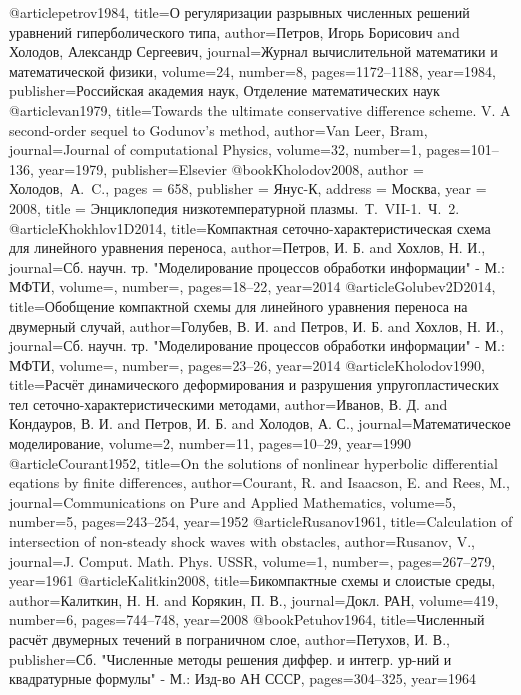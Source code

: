 \documentclass[11pt]{article}
\begin{document}
\begin{thebibliography}{99}
@article{petrov1984,
  title={О регуляризации разрывных численных решений уравнений гиперболического типа},
  author={Петров, Игорь Борисович and Холодов, Александр Сергеевич},
  journal={Журнал вычислительной математики и математической физики},
  volume={24},
  number={8},
  pages={1172--1188},
  year={1984},
  publisher={Российская академия наук, Отделение математических наук}
}
@article{van1979,
  title={Towards the ultimate conservative difference scheme. V. A second-order sequel to Godunov's method},
  author={Van Leer, Bram},
  journal={Journal of computational Physics},
  volume={32},
  number={1},
  pages={101--136},
  year={1979},
  publisher={Elsevier}
}
@book{Kholodov2008,
author = {Холодов,~А.~C.},
pages = {658},
publisher = {Янус-К},
address = {Москва},
year = {2008},
title = {Энциклопедия низкотемпературной плазмы.~Т.~VII-1.~Ч.~2.}
}
@article{Khokhlov1D2014,
  title={Компактная сеточно-характеристическая схема для линейного уравнения переноса},
  author={Петров, И. Б. and Хохлов, Н. И.},
  journal={Сб. научн. тр. "Моделирование процессов обработки информации" - М.: МФТИ},
  volume={},
  number={},
  pages={18--22},
  year={2014}
}
@article{Golubev2D2014,
  title={Обобщение компактной схемы для линейного уравнения переноса на двумерный случай},
  author={Голубев, В. И. and Петров, И. Б. and Хохлов, Н. И.},
  journal={Сб. научн. тр. "Моделирование процессов обработки информации" - М.: МФТИ},
  volume={},
  number={},
  pages={23--26},
  year={2014}
}
@article{Kholodov1990,
  title={Расчёт динамического деформирования и разрушения упругопластических тел сеточно-характеристическими методами},
  author={Иванов, В. Д. and Кондауров, В. И. and Петров, И. Б. and Холодов, А. С.},
  journal={Математическое моделирование},
  volume={2},
  number={11},
  pages={10--29},
  year={1990}
}
@article{Courant1952,
  title={On the solutions of nonlinear hyperbolic differential eqations by finite differences},
  author={Courant, R. and Isaacson, E. and Rees, M.},
  journal={Communications on Pure and Applied Mathematics},
  volume={5},
  number={5},
  pages={243--254},
  year={1952}
}
@article{Rusanov1961,
  title={Calculation of intersection of non-steady shock waves with obstacles},
  author={Rusanov, V.},
  journal={J. Comput. Math. Phys. USSR},
  volume={1},
  number={},
  pages={267--279},
  year={1961}
}
@article{Kalitkin2008,
  title={Бикомпактные схемы и слоистые среды},
  author={Калиткин, Н. Н. and Корякин, П. В.},
  journal={Докл. РАН},
  volume={419},
  number={6},
  pages={744--748},
  year={2008}
}
@book{Petuhov1964,
  title={Численный расчёт двумерных течений в пограничном слое},
  author={Петухов, И. В.},
  publisher={Сб. "Численные методы решения диффер. и интегр. ур-ний и квадратурные формулы" - М.: Изд-во АН СССР},
  pages={304--325},
  year={1964}
}

\fi

\end{thebibliography}
\end{document}
